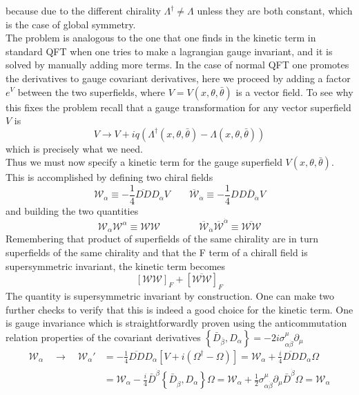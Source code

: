 \documentclass[12pt]{article}
\begin{document}
because due to the different chirality $\Lambda^\dagger \neq \Lambda $ unless they are both constant, which is the case of global symmetry. \\
The problem is analogous to the one that one finds in the kinetic term in standard QFT when one tries to make a lagrangian gauge invariant, and it is solved by manually adding more terms. In the case of normal QFT one
promotes the derivatives to gauge covariant derivatives, here we proceed by adding a factor $e^V$ between the two superfields, where $V=V(x,\theta,\bar\theta)$ is a vector field. To see why this fixes the problem recall that a gauge transformation for any vector superfield $V$ is
\begin{equation*}
  V \to V + iq\left(\Lambda^\dagger(x, \theta, \bar\theta) - \Lambda(x, \theta, \bar\theta)\right)
\end{equation*}
which is precisely what we need. \\
Thus we must now specify a kinetic term for the gauge superfield $V(x, \theta, \bar\theta)$. This is accomplished by defining two chiral fields 
\begin{equation*}
  \mathcal{W_\alpha} \equiv -\frac{1}{4}\overline{DD}D_\alpha V \qquad \overline{\mathcal{W}}_{\dot\alpha} \equiv -\frac{1}{4}DD \overline{D}_{\dot\alpha} V
\end{equation*}
and building the two quantities
\begin{equation*}
  \mathcal{W}_{\alpha} \mathcal{W}^{\alpha} \equiv \mathcal{W}\mathcal{W} \qquad\qquad \overline{\mathcal{W}}_{\dot\alpha} \overline{\mathcal{W}}^{\dot\alpha} \equiv \overline{\mathcal{W}\mathcal{W}}
\end{equation*}
Remembering that product of superfields of the same chirality are in turn superfields of the same chirality and that the F term of a chirall field is supersymmetric invariant, the kinetic term becomes 
\begin{equation*}
  \left[\mathcal{W}\mathcal{W}\right]_F + \left[\overline{\mathcal{W}\mathcal{W}}\right]_F
\end{equation*}
The quantity is supersymmetric invariant by construction. One can make two further checks to verify that this is indeed a good choice for the kinetic term. One is gauge invariance which is straightforwardly proven using the anticommutation relation properties of the covariant derivatives $\left\{\bar{D}_{\bar\beta}, D_{\alpha}\right\}= - 2 i \sigma_{\alpha \dot{\beta}}^{\mu} \partial_{\mu}$
\begin{equation*}
  \begin{aligned}
      \mathcal{W}_{\alpha} \quad\to\quad \mathcal{W_\alpha}' &= -\frac{1}{4} \overline{D D} D_{\alpha}\left[V+i\left(\Omega^{\dagger}-\Omega\right)\right] =\mathcal{W}_{\alpha}+\frac{i}{4} \overline{D D} D_{\alpha} \Omega \\
      &=\mathcal{W}_{\alpha}-\frac{i}{4} \bar{D}^{\dot{\beta}}\left\{\bar{D}_{\dot{\beta}}, D_{\alpha}\right\} \Omega 
      =\mathcal{W}_{\alpha}+\frac{1}{2} \sigma_{\alpha \dot{\beta}}^{\mu} \partial_{\mu} \bar{D}^{\dot{\beta}} \Omega
      =\mathcal{W}_{\alpha}
  \end{aligned}
\end{equation*}
\end{document}
